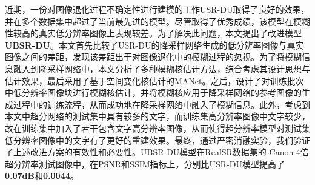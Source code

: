 近期，一份对图像退化过程不确定性进行建模的工作USR-DU取得了良好的效果，并在多个数据集中超过了当前最先进的模型。尽管取得了优秀成绩，该模型在模糊性较高的真实低分辨率图像上表现较差。为了解决此问题，本文提出了改进模型\textbf{UBSR-DU}。本文首先比较了USR-DU的降采样网络生成的低分辨率图像与真实图像之间的差距，发现该差距出于对图像退化中的模糊过程的忽视。为了将模糊信息融入到降采样网络中，本文分析了多种模糊核估计方法，综合考虑其设计思想与估计效果，最后采用了基于空间变化核估计的MANet。之后，设计了对训练批次中低分辨率图像块进行模糊核估计，并将模糊核应用于降采样网络的参考图像的生成过程中的训练流程，从而成功地在降采样网络中融入了模糊信息。此外，考虑到本文中超分网络的测试集中具有较多的文字，而训练集高分辨率图像中文字较少，故在训练集中加入了若干包含文字高分辨率图像，从而使得超分辨率模型对测试集低分辨率图像中的文字有了更好的重建效果。最终，通过严密消融实验，我们验证了上述改进方案的有效性和必要性。UBSR-DU模型在RealSR数据集的 Canon 4倍超分辨率测试图像中，在PSNR和SSIM指标上，分别比USR-DU模型提高了\textbf{0.07dB}和\textbf{0.0044}。
